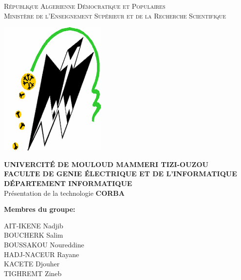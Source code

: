 \begin{center}
    \textsc{\large{République Algerienne Démocratique et Populaires}}\\ \medskip
    \textsc{\large{Ministère de l'Enseignement Supérieur et de la Recherche Scientifique}}\\
\end{center}

\begin{center}
    \includegraphics[scale=0.5]{pdg/ummto.png}\vspace*{0.5cm}
\end{center}

\begin{center}
    \textbf{\small{UNIVERCITÉ DE MOULOUD MAMMERI TIZI-OUZOU}}\\ \smallskip
    \textbf{\small{FACULTE DE GENIE ÉLECTRIQUE ET DE L’INFORMATIQUE}}\\ \smallskip
    \textbf{\small{DÉPARTEMENT INFORMATIQUE}}\\ \vspace*{1cm}
    \LARGE{Présentation de la technologie \textbf{CORBA}}\\
    
\end{center} \vspace*{1cm}

\begin{flushleft}
    \textbf{\large{Membres du groupe}:} \vspace{0.5cm}

        \hspace{0.5cm}AIT-IKENE Nadjib\\
        \hspace{0.5cm}BOUCHERK Salim\\
        \hspace{0.5cm}BOUSSAKOU Noureddine \\
        \hspace{0.5cm}HADJ-NACEUR Rayane \\
        \hspace{0.5cm}KACETE Djouher\\
        \hspace{0.5cm}TIGHREMT Zineb\\

\vspace*{3cm}

\end{flushleft}

